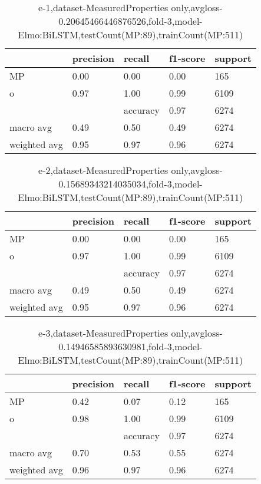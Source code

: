 \begin{table}[!ht] 
\centering
\caption{e-1,dataset-MeasuredProperties only,avgloss-0.20645466446876526,fold-3,model-Elmo:BiLSTM,testCount(MP:89),trainCount(MP:511)}\label{e-1data-mpS.tsv}
\begin{tabularx}{300pt}{|X|X|X|X|X|}
\hline
&precision&recall&f1-score&support\\
\hline
MP&0.00&0.00&0.00&165\\
\hline
o&0.97&1.00&0.99&6109\\
\hline
&&accuracy&0.97&6274\\
\hline
macro avg&0.49&0.50&0.49&6274\\
\hline
weighted avg&0.95&0.97&0.96&6274\\
\hline
\end{tabularx}
\end{table}
\begin{table}[!ht] 
\centering
\caption{e-2,dataset-MeasuredProperties only,avgloss-0.15689343214035034,fold-3,model-Elmo:BiLSTM,testCount(MP:89),trainCount(MP:511)}\label{e-2data-mpS.tsv}
\begin{tabularx}{300pt}{|X|X|X|X|X|}
\hline
&precision&recall&f1-score&support\\
\hline
MP&0.00&0.00&0.00&165\\
\hline
o&0.97&1.00&0.99&6109\\
\hline
&&accuracy&0.97&6274\\
\hline
macro avg&0.49&0.50&0.49&6274\\
\hline
weighted avg&0.95&0.97&0.96&6274\\
\hline
\end{tabularx}
\end{table}
\begin{table}[!ht] 
\centering
\caption{e-3,dataset-MeasuredProperties only,avgloss-0.14946585893630981,fold-3,model-Elmo:BiLSTM,testCount(MP:89),trainCount(MP:511)}\label{e-3data-mpS.tsv}
\begin{tabularx}{300pt}{|X|X|X|X|X|}
\hline
&precision&recall&f1-score&support\\
\hline
MP&0.42&0.07&0.12&165\\
\hline
o&0.98&1.00&0.99&6109\\
\hline
&&accuracy&0.97&6274\\
\hline
macro avg&0.70&0.53&0.55&6274\\
\hline
weighted avg&0.96&0.97&0.96&6274\\
\hline
\end{tabularx}
\end{table}
